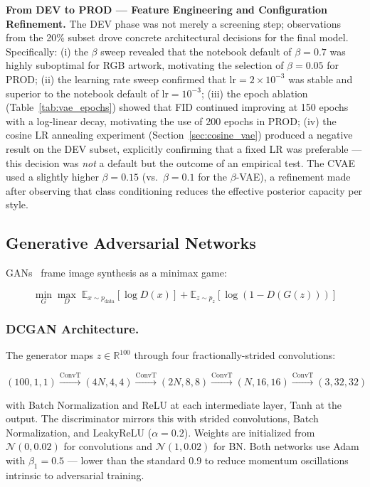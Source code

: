 \documentclass[runningheads]{llncs}
\begin{document}
\noindent\textbf{From DEV to PROD — Feature Engineering and Configuration Refinement.} The DEV phase was not merely a screening step; observations from the 20\% subset drove concrete architectural decisions for the final model. Specifically: (i) the $\beta$ sweep revealed that the notebook default of $\beta=0.7$ was highly suboptimal for RGB artwork, motivating the selection of $\beta=0.05$ for PROD; (ii) the learning rate sweep confirmed that lr$=2{\times}10^{-3}$ was stable and superior to the notebook default of lr$=10^{-3}$; (iii) the epoch ablation (Table~\ref{tab:vae_epochs}) showed that FID continued improving at 150 epochs with a log-linear decay, motivating the use of 200 epochs in PROD; (iv) the cosine LR annealing experiment (Section~\ref{sec:cosine_vae}) produced a negative result on the DEV subset, explicitly confirming that a fixed LR was preferable — this decision was \emph{not} a default but the outcome of an empirical test. The CVAE used a slightly higher $\beta=0.15$ (vs.\ $\beta=0.1$ for the $\beta$-VAE), a refinement made after observing that class conditioning reduces the effective posterior capacity per style.

\subsection{Generative Adversarial Networks}\label{sec:gans}

GANs~\cite{radford2015} frame image synthesis as a minimax game:

\begin{equation}
\min_G \max_D \; \mathbb{E}_{x \sim p_\text{data}}[\log D(x)] + \mathbb{E}_{z \sim p_z}[\log(1 - D(G(z)))]
\end{equation}

\subsubsection{DCGAN Architecture.}

The generator maps $z \in \mathbb{R}^{100}$ through four fractionally-strided convolutions:

\begin{equation}
(100,1,1) \xrightarrow{\text{ConvT}} (4N,4,4) \xrightarrow{\text{ConvT}} (2N,8,8) \xrightarrow{\text{ConvT}} (N,16,16) \xrightarrow{\text{ConvT}} (3,32,32)
\end{equation}

with Batch Normalization and ReLU at each intermediate layer, Tanh at the output. The discriminator mirrors this with strided convolutions, Batch Normalization, and LeakyReLU ($\alpha=0.2$). Weights are initialized from $\mathcal{N}(0,0.02)$ for convolutions and $\mathcal{N}(1,0.02)$ for BN. Both networks use Adam with $\beta_1=0.5$ — lower than the standard 0.9 to reduce momentum oscillations intrinsic to adversarial training.
\end{document}
